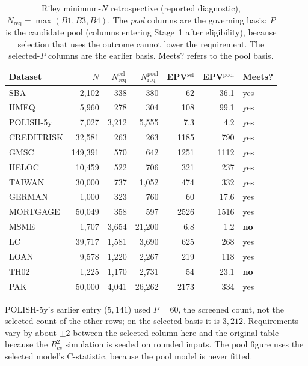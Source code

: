 \documentclass[9pt,journal]{IEEEtai}
\begin{document}
\begin{table}[!t]
\centering
\caption{Riley minimum-$N$ retrospective (reported diagnostic), $N_{\text{req}}=\max(B1,B3,B4)$. The
\emph{pool} columns are the governing basis: $P$ is the candidate pool (columns entering Stage~1 after
eligibility), because selection that uses the outcome cannot lower the requirement. The selected-$P$ columns
are the earlier basis. Meets? refers to the pool basis.}
\label{tab:riley}
\footnotesize
\setlength{\tabcolsep}{2.5pt}
\begin{tabular}{@{}lrrrrrl@{}}
\toprule
Dataset & $N$ & $N_{\text{req}}^{\text{sel}}$ & $N_{\text{req}}^{\text{pool}}$ & EPV$^{\text{sel}}$ & EPV$^{\text{pool}}$ & Meets? \\
\midrule
SBA        & 2{,}102 & 338 & 380 & 62 & 36.1 & yes \\
HMEQ       & 5{,}960 & 278 & 304 & 108 & 99.1 & yes \\
POLISH-5y  & 7{,}027 & 3{,}212 & 5{,}555 & 7.3 & 4.2 & yes \\
CREDITRISK & 32{,}581 & 263 & 263 & 1185 & 790 & yes \\
GMSC       & 149{,}391 & 570 & 642 & 1251 & 1112 & yes \\
HELOC      & 10{,}459 & 522 & 706 & 321 & 237 & yes \\
TAIWAN     & 30{,}000 & 737 & 1{,}052 & 474 & 332 & yes \\
GERMAN     & 1{,}000 & 323 & 760 & 60 & 17.6 & yes \\
MORTGAGE   & 50{,}049 & 358 & 597 & 2526 & 1516 & yes \\
MSME       & 1{,}707 & 3{,}654 & 21{,}200 & 6.8 & 1.2 & \textbf{no} \\
LC         & 39{,}717 & 1{,}581 & 3{,}690 & 625 & 268 & yes \\
LOAN       & 9{,}578 & 1{,}220 & 2{,}267 & 219 & 118 & yes \\
TH02       & 1{,}225 & 1{,}170 & 2{,}731 & 54 & 23.1 & \textbf{no} \\
PAK        & 50{,}000 & 4{,}041 & 26{,}262 & 2173 & 334 & yes \\
\bottomrule
\end{tabular}

\vspace{2pt}
{\footnotesize POLISH-5y's earlier entry ($5{,}141$) used $P{=}60$, the screened count, not the selected count of the
other rows; on the selected basis it is $3{,}212$. Requirements vary by about $\pm2$ between the selected column
here and the original table because the $R^2_{cs}$ simulation is seeded on rounded inputs. The pool figure uses the
selected model's C-statistic, because the pool model is never fitted.\par}
\end{table}
\end{document}
